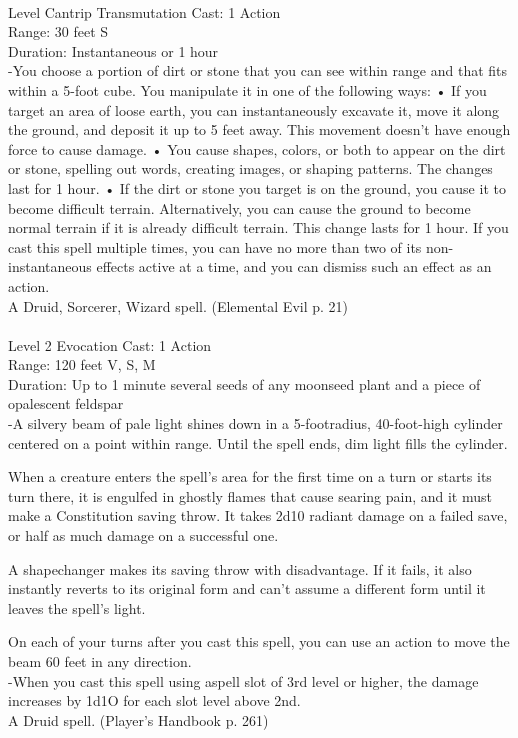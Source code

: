 \documentclass[10pt,twocolumn]{report}
\begin{document}
 \\
Level Cantrip \quad Transmutation \quad Cast: 1 Action\\
Range: 30 feet \quad S\\
Duration: Instantaneous or 1 hour \quad \\
-You choose a portion of dirt or stone that you can see within range and that fits within a 5-foot cube. You manipulate it in one of the following ways:
• If you target an area of loose earth, you can instantaneously excavate it, move it along the ground, and deposit it up to 5 feet away. This movement doesn’t have enough force to cause damage.
• You cause shapes, colors, or both to appear on the dirt or stone, spelling out words, creating images, or shaping patterns. The changes last for 1 hour.
• If the dirt or stone you target is on the ground, you cause it to become difficult terrain. Alternatively, you can cause the ground to become normal terrain if it is already difficult terrain. This change lasts for 1 hour. If you cast this spell multiple times, you can have no more than two of its non-instantaneous effects active at a time, and you can dismiss such an effect as an action.\\
A Druid, Sorcerer, Wizard spell. (Elemental Evil p. 21) \\


 \\
Level 2 \quad Evocation \quad Cast: 1 Action\\
Range: 120 feet \quad V, S, M\\
Duration: Up to 1 minute \quad several seeds of any moonseed plant and a piece of opalescent feldspar\\
-A silvery beam of pale light shines down in a 5-footradius, 40-foot-high cylinder centered on a point within range. Until the spell ends, dim light fills the cylinder.


When a creature enters the spell’s area for the first time on a turn or starts its turn there, it is engulfed in ghostly flames that cause searing pain, and it must make a Constitution saving throw. It takes 2d10 radiant damage on a failed save, or half as much damage on a successful one.

A shapechanger makes its saving throw with disadvantage. If it fails, it also instantly reverts to its original form and can’t assume a different form until it leaves the spell’s light.

On each of your turns after you cast this spell, you can use an action to move the beam 60 feet in any direction.\\
-When you cast this spell using aspell slot of 3rd level or higher, the damage increases by 1d1O for each slot level above 2nd.\\
A Druid spell. (Player's Handbook p. 261) \\
\end{document}
